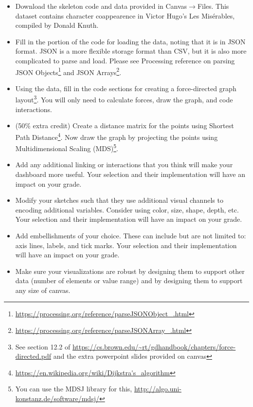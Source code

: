 \documentclass[a4paper,12pt]{article}
\begin{document}
\begin{itemize}

\item Download the skeleton code and data provided in Canvas$\rightarrow$Files. This dataset contains character coappearence in Victor Hugo's Les Misérables, compiled by Donald Knuth. 

\item Fill in the portion of the code for loading the data, noting that it is in JSON format. JSON is a more flexible storage format than CSV, but it is also more complicated to parse and load. Please see Processing reference on parsing JSON Objects\footnote{\url{https://processing.org/reference/parseJSONObject_.html}} and JSON Arrays\footnote{\url{https://processing.org/reference/parseJSONArray_.html}}.

\item Using the data, fill in the code sections for creating a force-directed graph layout\footnote{See section 12.2 of \url{https://cs.brown.edu/~rt/gdhandbook/chapters/force-directed.pdf} and the extra powerpoint slides provided on canvas}. You will only need to calculate forces, draw the graph, and code interactions.

\item (50\% extra credit) Create a distance matrix for the points using Shortest Path Distance\footnote{\url{https://en.wikipedia.org/wiki/Dijkstra's_algorithm}}. Now draw the graph by projecting the points using Multidimensional Scaling (MDS)\footnote{You can use the MDSJ library for this, \url{http://algo.uni-konstanz.de/software/mdsj/}}.

\item Add any additional linking or interactions that you think will make your dashboard more useful. Your selection and their implementation will have an impact on your grade.

\item Modify your sketches such that they use additional visual channels to encoding additional variables. Consider using color, size, shape, depth, etc. Your selection and their implementation will have an impact on your grade.

\item Add embellishments of your choice. These can include but are not limited to: axis lines, labels, and tick marks. Your selection and their implementation will have an impact on your grade.

\item Make sure your visualizations are robust by designing them to support other data (number of elements or value range) and by designing them to support any size of canvas.

\end{itemize}
\end{document}
